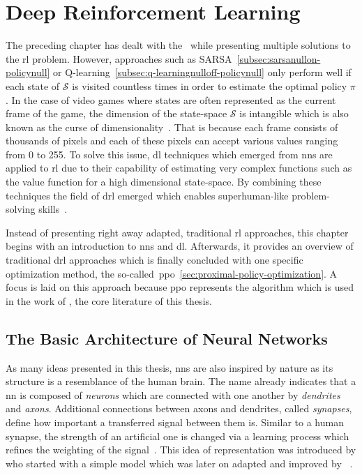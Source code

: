 \documentclass[draft,final]{vutinfth} %
\newcommand{\p}[1]{see p. #1}
\begin{document}
    \glsresetall


    \chapter{Deep Reinforcement Learning}\label{ch:deep-reinforcement-learning}


    The preceding chapter has dealt with the~ while presenting multiple solutions to the \gls{rl} problem.
    However, approaches such as SARSA~\eqref{subsec:sarsanullon-policynull} or Q-learning~\eqref{subsec:q-learningnulloff-policynull} only perform well if each state of $\mathcal{S}$ is visited countless times in order to estimate the optimal policy $\pi$.
    In the case of video games where states are often represented as the current frame of the game, the dimension of the state-space $\mathcal{S}$ is intangible which is also known as the curse of dimensionality~\citep[\p{151}]{goodfellow_deep_2016}.
    That is because each frame consists of thousands of pixels and each of these pixels can accept various values ranging from 0 to 255.
    To solve this issue, \gls{dl} techniques which emerged from \glspl{nn} are applied to \gls{rl} due to their capability of estimating very complex functions such as the value function for a high dimensional state-space.
    By combining these techniques the field of \gls{drl} emerged which enables superhuman-like problem-solving skills~\citep{francois-lavet_introduction_2018}.

    Instead of presenting right away adapted, traditional \gls{rl} approaches, this chapter begins with an introduction to \glspl{nn} and \gls{dl}.
    Afterwards, it provides an overview of traditional \gls{drl} approaches which is finally concluded with one specific optimization method, the so-called~\gls{ppo}~\eqref{sec:proximal-policy-optimization}.
    A focus is laid on this approach because \gls{ppo} represents the algorithm which is used in the work of \citet{burda_large-scale_2018-1}, the core literature of this thesis.


    \section{The Basic Architecture of Neural Networks}\label{subsec:the-basic-architecture-of-neural-networks}


    As many ideas presented in this thesis, \glspl{nn} are also inspired by nature as its structure is a resemblance of the human brain.
    The name already indicates that a \gls{nn} is composed of \textit{neurons} which are connected with one another by \textit{dendrites} and \textit{axons}.
    Additional connections between axons and dendrites, called \textit{synapses}, define how important a transferred signal between them is.
    Similar to a human synapse, the strength of an artificial one is changed via a learning process which refines the weighting of the signal~\citep[\p{1f}]{aggarwal_neural_2018}.
    This idea of representation was introduced by \citeauthor{mcculloch_logical_1943} who started with a simple model which was later on adapted and improved by \citeauthor{rosenblatt_perceptron_1957}~\citep[\p{167}]{awad_deep_2015}.
\end{document}
